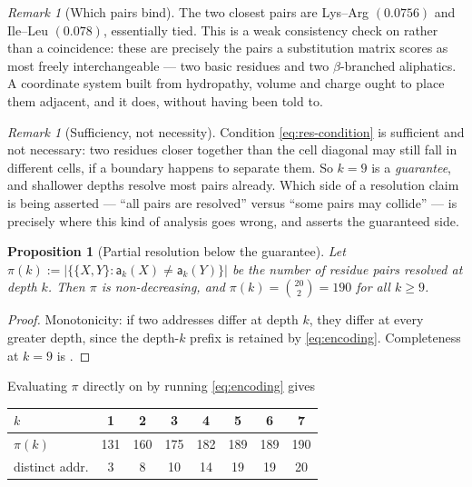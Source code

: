 \documentclass[11pt,twocolumn,a4paper]{article}
\theoremstyle{thmstyle}
\newtheorem{proposition}[theorem]{Proposition}
\theoremstyle{definition}
\theoremstyle{remark}
\newtheorem{remark}[theorem]{Remark}
\newcommand{\addr}{\mathsf{a}}
\newcommand{\abs}[1]{\lvert#1\rvert}
\begin{document}
\begin{remark}[Which pairs bind]
\label{rem:dmin-pair}
The two closest pairs are Lys--Arg $(0.0756)$ and Ile--Leu $(0.078)$,
essentially tied. This is a weak consistency check on
 rather than a coincidence: these are precisely the
pairs a substitution matrix scores as most freely interchangeable
\citep{henikoff1992,grantham1974} --- two basic residues and two
$\beta$-branched aliphatics. A coordinate system built from hydropathy,
volume and charge ought to place them adjacent, and it does, without
having been told to.
\end{remark}

\begin{remark}[Sufficiency, not necessity]
\label{rem:res-sufficient}
Condition \eqref{eq:res-condition} is sufficient and not necessary: two
residues closer together than the cell diagonal may still fall in
different cells, if a boundary happens to separate them. So $k = 9$ is
a \emph{guarantee}, and shallower depths resolve most pairs already.
Which side of a resolution claim is being asserted --- ``all pairs are
resolved'' versus ``some pairs may collide'' --- is precisely where
this kind of analysis goes wrong, and  asserts
the guaranteed side.
\end{remark}

\begin{proposition}[Partial resolution below the guarantee]
\label{prop:partial-res}
Let $\pi(k) := \abs{\{\{X,Y\} : \addr_k(X)\neq\addr_k(Y)\}}$ be the
number of residue pairs resolved at depth $k$. Then $\pi$ is
non-decreasing, and $\pi(k) = \binom{20}{2} = 190$ for all $k \geq 9$.
\end{proposition}

\begin{proof}
Monotonicity: if two addresses differ at depth $k$, they differ at
every greater depth, since the depth-$k$ prefix is retained by
\eqref{eq:encoding}. Completeness at $k = 9$ is
.
\end{proof}

Evaluating $\pi$ directly on  by running
\eqref{eq:encoding} gives
\begin{center}
\small
\begin{tabular}{lccccccc}
\toprule
$k$ & 1 & 2 & 3 & 4 & 5 & 6 & 7 \\
\midrule
$\pi(k)$        & 131 & 160 & 175 & 182 & 189 & 189 & 190 \\
distinct addr.  & 3   & 8   & 10  & 14  & 19  & 19  & 20  \\
\bottomrule
\end{tabular}
\end{center}
\end{document}
